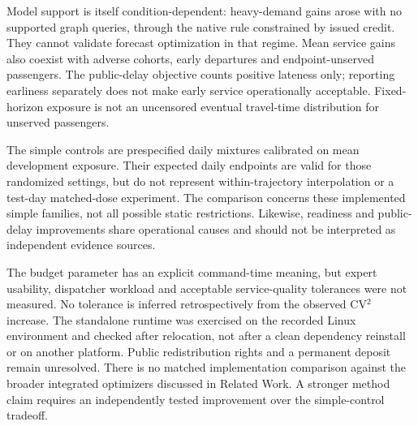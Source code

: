 Model support is itself condition-dependent: heavy-demand gains arose with no supported graph queries, through the native rule constrained by issued credit. They cannot validate forecast optimization in that regime. Mean service gains also coexist with adverse cohorts, early departures and endpoint-unserved passengers. The public-delay objective counts positive lateness only; reporting earliness separately does not make early service operationally acceptable. Fixed-horizon exposure is not an uncensored eventual travel-time distribution for unserved passengers.

The simple controls are prespecified daily mixtures calibrated on mean development exposure. Their expected daily endpoints are valid for those randomized settings, but do not represent within-trajectory interpolation or a test-day matched-dose experiment. The comparison concerns these implemented simple families, not all possible static restrictions. Likewise, readiness and public-delay improvements share operational causes and should not be interpreted as independent evidence sources.

The budget parameter has an explicit command-time meaning, but expert usability, dispatcher workload and acceptable service-quality tolerances were not measured. No tolerance is inferred retrospectively from the observed CV$^2$ increase. The standalone runtime was exercised on the recorded Linux environment and checked after relocation, not after a clean dependency reinstall or on another platform. Public redistribution rights and a permanent deposit remain unresolved. There is no matched implementation comparison against the broader integrated optimizers discussed in Related Work. A stronger method claim requires an independently tested improvement over the simple-control tradeoff.

